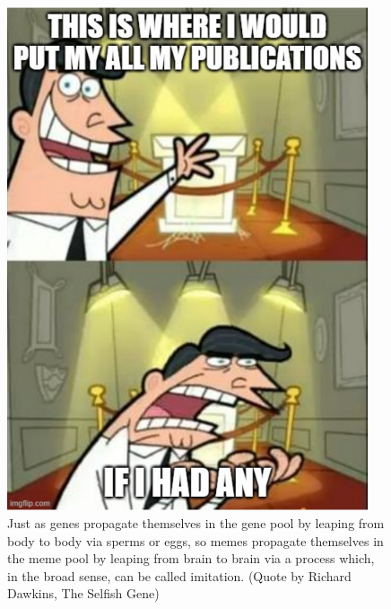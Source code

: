 \begin{figure}[!t]
\centering
\includegraphics[width=0.95\textwidth]{Images/IfIHadAny.pdf}
\caption[A very serious short caption]{Just as genes propagate themselves in the gene pool by leaping from body to body via sperms or eggs, so memes propagate themselves in the meme pool by leaping from brain to brain via a process which, in the broad sense, can be called imitation. (Quote by Richard Dawkins, The Selfish Gene)}
\label{fig:SomethingMeaningful}
\end{figure}
